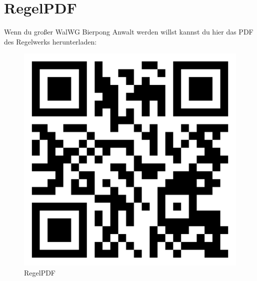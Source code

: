 \documentclass[a5paper, 12pt]{book}
\begin{document}
\chapter{RegelPDF}
Wenn du großer WalWG Bierpong Anwalt werden willst kannst du hier das PDF des Regelwerks herunterladen:
\begin{figure}
    \centering
    \includegraphics[scale = 0.1]{Bierpongregeln}
    \caption{RegelPDF}
\end{figure}
\end{document}
